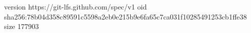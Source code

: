 version https://git-lfs.github.com/spec/v1
oid sha256:78b04d358c89591c5598a2eb0e215b9e6fa65c7ca031f10285491253cb1ffe38
size 177903
